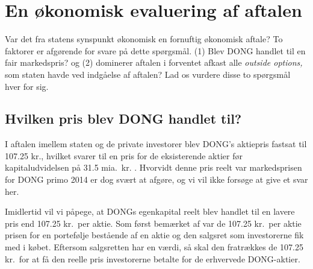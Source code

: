 \documentclass{article}
\begin{document}
\section{En økonomisk evaluering af aftalen}

Var det fra statens synspunkt økonomisk en fornuftig økonomisk aftale? To faktorer er afgørende for svare på dette spørgsmål. (1) Blev DONG handlet til en fair markedspris? og (2) dominerer aftalen i forventet afkast  alle \emph{outside options,} som staten havde ved indgåelse af aftalen? Lad os vurdere disse to spørgsmål hver for sig.

\subsection{Hvilken pris blev DONG handlet til?}

I aftalen imellem staten og de private investorer blev  DONG's aktiepris fastsat til 107.25 kr., hvilket svarer til en pris for de eksisterende aktier før kapitaludvidelsen på 31.5 mia.\ kr. \citep{FM2013a}. Hvorvidt denne pris reelt var markedsprisen for DONG primo 2014 er dog svært at afgøre, og vi vil ikke forsøge at give et svar her. 

Imidlertid vil vi påpege, at DONGs egenkapital reelt blev handlet til en lavere pris end 107.25 kr.\ per aktie. Som først bemærket af \cite{Moeller2014} var de 107.25 kr.\ per aktie prisen for en portefølje bestående af en aktie og den salgsret som investorerne fik med i købet. Eftersom salgsretten har en værdi, så skal den fratrækkes de 107.25 kr.\ for at få den reelle pris investorerne betalte for de erhvervede DONG-aktier.
\end{document}
